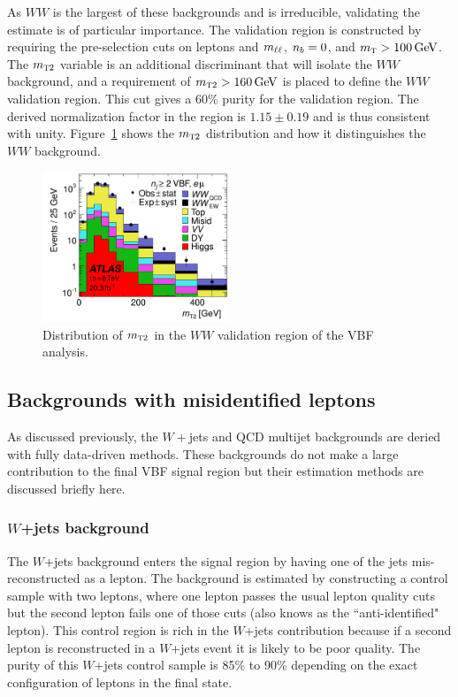 As $WW$ is the largest of these backgrounds and is irreducible, validating the estimate is of particular importance. The validation region is constructed by requiring the pre-selection cuts on leptons and $m_{\ell\ell}$, $n_b = 0$, and $\mTH > 100 \GeV$. The $m_{\textrm{\footnotesize\sc t}2}$ variable\cite{mt2} is an additional discriminant that will isolate the $WW$ background, and a requirement of $\mTtwo > 160 \GeV$ is placed to define the $WW$ validation region. This cut gives a 60\% purity for the validation region. The derived normalization factor in the region is $1.15 \pm 0.19$ and is thus consistent with unity. Figure~\ref{fig:mt2} shows the $m_{\textrm{\footnotesize\sc t}2}$ distribution and how it distinguishes the $WW$ background.

\begin{figure}[h!]
  \centering
  \captionsetup{justification=centering}
  \includegraphics[width=0.5\textwidth]{figures/VBF_mT2}
  \caption{Distribution of $m_{\textrm{\footnotesize\sc t}2}$ in the $WW$ validation region of the VBF analysis\cite{WW2015}.}
  \label{fig:mt2}
\end{figure}

\subsection{Backgrounds with misidentified leptons}

As discussed previously, the $W+$jets and QCD multijet backgrounds are deried with fully data-driven methods. These backgrounds do not make a large contribution to the final VBF signal region but their estimation methods are discussed briefly here.

\subsubsection{$W$+jets background}

The $W$+jets background enters the signal region by having one of the jets mis-reconstructed as a lepton. The background is estimated by constructing a control sample with two leptons, where one lepton passes the usual lepton quality cuts but the second lepton fails one of those cuts (also knows as the ``anti-identified" lepton). This control region is rich in the $W$+jets contribution because if a second lepton is reconstructed in a $W$+jets event it is likely to be poor quality. The purity of this $W$+jets control sample is 85\% to 90\% depending on the exact configuration of leptons in the final state.

